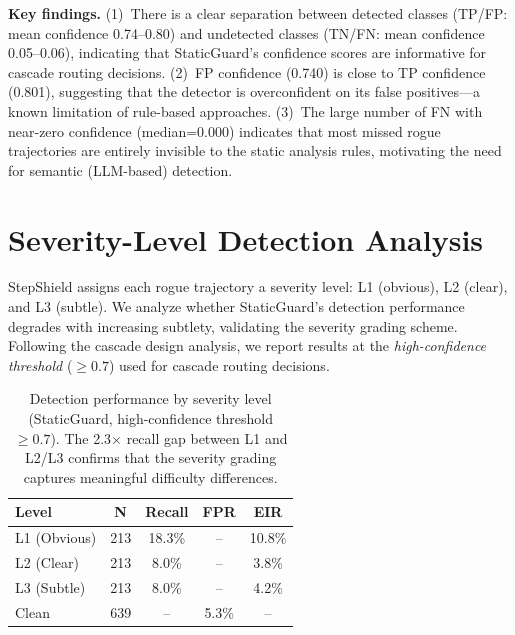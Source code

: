 \documentclass{article}
\begin{document}
\textbf{Key findings.} (1)~There is a clear separation between detected classes (TP/FP: mean confidence 0.74--0.80) and undetected classes (TN/FN: mean confidence 0.05--0.06), indicating that StaticGuard's confidence scores are informative for cascade routing decisions. (2)~FP confidence (0.740) is close to TP confidence (0.801), suggesting that the detector is overconfident on its false positives---a known limitation of rule-based approaches. (3)~The large number of FN with near-zero confidence (median=0.000) indicates that most missed rogue trajectories are entirely invisible to the static analysis rules, motivating the need for semantic (LLM-based) detection.



\section{Severity-Level Detection Analysis}
\label{app:severity}

StepShield assigns each rogue trajectory a severity level: L1 (obvious), L2 (clear), and L3 (subtle). We analyze whether StaticGuard's detection performance degrades with increasing subtlety, validating the severity grading scheme. Following the cascade design analysis, we report results at the \emph{high-confidence threshold} ($\geq 0.7$) used for cascade routing decisions.

\begin{table}[h]
\caption{Detection performance by severity level (StaticGuard, high-confidence threshold $\geq 0.7$). The 2.3$\times$ recall gap between L1 and L2/L3 confirms that the severity grading captures meaningful difficulty differences.}
\label{tab:severity_detection}
\vskip 0.15in
\begin{center}
\begin{small}
\begin{sc}
\begin{tabular}{lcccc}
\toprule
Level & N & Recall & FPR & EIR \\
\midrule
L1 (Obvious) & 213 & 18.3\% & -- & 10.8\% \\
L2 (Clear) & 213 & 8.0\% & -- & 3.8\% \\
L3 (Subtle) & 213 & 8.0\% & -- & 4.2\% \\
\midrule
Clean & 639 & -- & 5.3\% & -- \\
\bottomrule
\end{tabular}
\end{sc}
\end{small}
\end{center}
\vskip -0.1in
\end{table}
\end{document}
